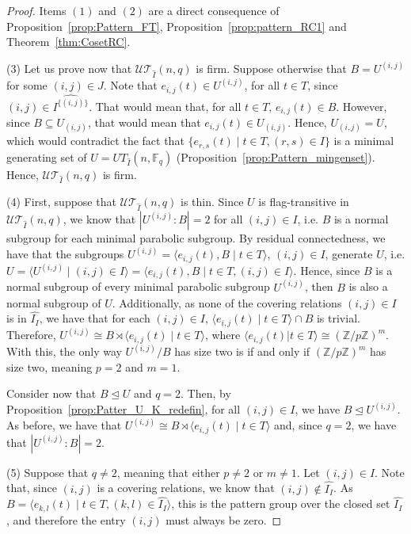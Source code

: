 \documentclass[11pt,letterpaper]{amsart}
\newcommand{\TT}{\mathcal{T}}
\newcommand{\ZZ}{\mathbb{Z}}
\newcommand{\FF}{\mathbb{F}}
\newcommand{\UU}{\mathcal{U}}
\begin{document}
\begin{proof}
    Items $(1)$ and $(2)$ are a direct consequence of Proposition~\ref{prop:Pattern_FT}, Proposition~\ref{prop:pattern_RC1} and Theorem~\ref{thm:CosetRC}.
    
    (3) Let us prove now that $\UU\TT_{\widehat{I}}(n,q)$ is firm.
    Suppose otherwise that $B=U^{(i,j)}$ for some $(i,j)\in J$. Note that $e_{i,j}(t)\in U^{(i,j)}$, for all $t\in T$, since $(i,j)\in \widehat{I^{\{(i,j)\}}}$. That would mean that, for all $t\in T$, $e_{i,j}(t)\in B$. However, since $B\subseteq U_{(i,j)}$, that would mean that $e_{i,j}(t)\in U_{(i,j)}$. Hence, $U_{(i,j)}=U$, which would contradict the fact that $\{e_{r,s}(t)\mid t\in T, (r,s)\in I\}$ is a minimal generating set of $U=UT_{\widehat{I}}(n,\FF_q)$ (Proposition~\ref{prop:Pattern_mingenset}). Hence, $\UU\TT_{\widehat{I}}(n,q)$ is firm.

    (4)
    First, suppose that $\UU\TT_{\widehat{I}}(n,q)$ is thin. Since $U$ is flag-transitive in $\UU\TT_{\widehat{I}}(n,q)$, we know that $|U^{(i,j)}:B|=2$ for all $(i,j)\in I$, i.e. $B$ is a normal subgroup for each minimal parabolic subgroup.
    By residual connectedness, we have that the subgroups $U^{(i,j)}=\langle e_{i,j}(t), B\mid t\in T\rangle$, $(i,j)\in I$, generate $U$, i.e. $U = \langle U^{(i,j)}\mid (i,j)\in I\rangle = \langle e_{i,j}(t), B\mid t\in T, (i,j)\in I\rangle$.
    Hence, since $B$ is a normal subgroup of every minimal parabolic subgroup $U^{(i,j)}$, then $B$ is also a normal subgroup of $U$.
    Additionally, as none of the covering relations $(i,j)\in I$ is in $\widehat{I_I}$, we have that for each $(i,j)\in I$, $\langle e_{i,j}(t)\mid t\in T\rangle\cap B$ is trivial. Therefore, $U^{(i,j)} \cong B\rtimes \langle e_{i,j}(t)\mid t\in T\rangle$, where $\langle e_{i,j}(t)|t\in T\rangle \cong (\ZZ/p\ZZ)^m$.
    With this, the only way $U^{(i,j)}/B$ has size two is if and only if $(\ZZ/p\ZZ)^m$ has size two, meaning $p=2$ and $m=1$.
    
    Consider now that $B\trianglelefteq U$ and $q=2$. Then, by Proposition~\ref{prop:Patter_U_K_redefin}, for all $(i,j)\in I$, we have $B\trianglelefteq U^{(i,j)}$. As before, we have that $U^{(i,j)} \cong B\rtimes \langle e_{i,j}(t)\mid t\in T\rangle$ and, since $q=2$, we have that $|U^{(i,j)}: B|=2$.
    
    (5)  
    Suppose that $q\neq 2$, meaning that either $p\neq 2$ or $m\neq 1$. Let $(i,j)\in I$. Note that, since $(i,j)$ is a covering relations, we know that $(i,j)\notin \widehat{I_I}$. As $B=\langle e_{k,l}(t)\mid t\in T, (k,l)\in \widehat{I_I}\rangle$, this is the pattern group over the closed set $\widehat{I_I}$, and therefore the entry $(i,j)$ must always be zero.
    

\end{proof}
\end{document}
